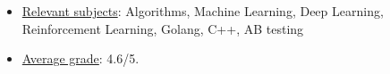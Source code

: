 \begin{itemize}
    \item \underline{Relevant subjects}: Algorithms, Machine Learning, Deep Learning, Reinforcement Learning, Golang, C++, AB testing
    \item \underline{Average grade}: 4.6/5.
\end{itemize}
